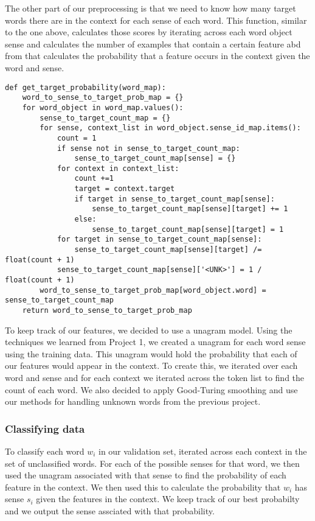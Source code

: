 \documentclass[11pt]{article}
\begin{document}
The other part of our preprocessing is that we need to know how many target words there are in the context for each sense of each word. This function, similar to the one above, calculates those scores by iterating across each word object sense and calculates the number of examples that contain a certain feature abd from that calculates the probability that a feature occurs in the context given the word and sense.

\begin{lstlisting}
def get_target_probability(word_map):
    word_to_sense_to_target_prob_map = {}
    for word_object in word_map.values():
        sense_to_target_count_map = {}
        for sense, context_list in word_object.sense_id_map.items():
            count = 1
            if sense not in sense_to_target_count_map:
                sense_to_target_count_map[sense] = {}
            for context in context_list:
                count +=1
                target = context.target
                if target in sense_to_target_count_map[sense]:
                    sense_to_target_count_map[sense][target] += 1
                else:
                    sense_to_target_count_map[sense][target] = 1
            for target in sense_to_target_count_map[sense]:
                sense_to_target_count_map[sense][target] /= float(count + 1)
            sense_to_target_count_map[sense]['<UNK>'] = 1 / float(count + 1)
        word_to_sense_to_target_prob_map[word_object.word] = sense_to_target_count_map
    return word_to_sense_to_target_prob_map
\end{lstlisting}

To keep track of our features, we decided to use a unagram model. Using the techniques we learned from Project 1, we created a unagram for each word sense using the training data. This unagram would hold the probability that each of our features would appear in the context. To create this, we iterated over each word and sense and for each context we iterated across the token list to find the count of each word. We also decided to apply Good-Turing smoothing and use our methods for handling unknown words from the previous project. \\ 

\subsubsection{Classifying data}

To classify each word $w_i$ in our validation set, iterated across each context in the set of unclassified words. For each of the possible senses for that word, we then used the unagram associated with that sense to find the probability of each feature in the context. We then used this to calculate the probability that $w_i$ has sense $s_i$ given the features in the context. We keep track of our best probabilty and we output the sense assciated with that probability.
\end{document}
